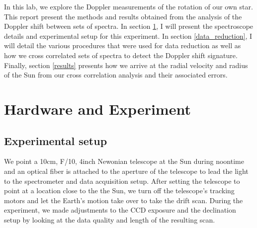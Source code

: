 \documentclass[authoryear, 12pt,5p, times]{elsarticle}
\begin{document}
In this lab, we explore the Doppler measurements of the rotation of our own star. This report present the methods and results obtained from the analysis of the Doppler shift between sets of spectra. In section \ref{hardwareexp}, I will present the spectroscope details and experimental setup for this experiment. In section \ref{data_reduction}, I will detail the various procedures that were used for data reduction as well as how we cross correlated sets of spectra to detect the Doppler shift signature. Finally, section \ref{results} presents how we arrive at the radial velocity and radius of the Sun from our cross correlation analysis and their associated errors. 
\section{Hardware and Experiment}
\label{hardwareexp}
\subsection{Experimental setup}
We point a 10cm, F/10, 4inch Newonian telescope at the Sun during noontime and 
an optical fiber is attached to the aperture of the telescope to lead the light to the spectrometer and data acquisition setup. After setting the telescope to point at a location close to the the Sun, we turn off the telescope's tracking motors and let the Earth's motion take over to take the drift scan. During the experiment, we made adjustments to the CCD exposure and the declination setup by looking at the data quality and length of the resulting scan. 
\end{document}
